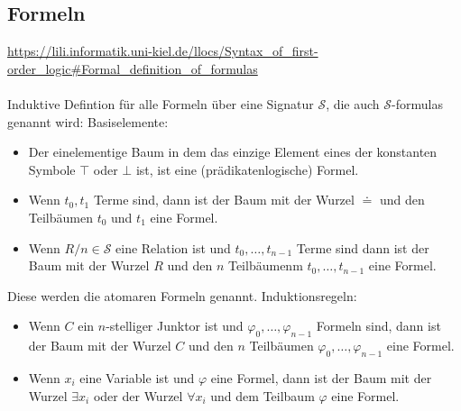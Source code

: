 \documentclass[twocolumn]{article}
\begin{document}
    \subsection{Formeln}
    \url{https://lili.informatik.uni-kiel.de/llocs/Syntax_of_first-order_logic#Formal_definition_of_formulas}\\\\
    Induktive Defintion für alle Formeln über eine Signatur $\mathcal{S}$, die auch $\mathcal{S}$-formulas genannt wird:
    Basiselemente:\\
    \begin{itemize}
        \item Der einelementige Baum in dem das einzige Element eines der konstanten Symbole $\top$ oder $\bot$ ist, ist eine (prädikatenlogische) Formel.
        \item Wenn $t_0,t_1$ Terme sind, dann ist der Baum mit der Wurzel $\doteq$ und den Teilbäumen $t_0$ und $t_1$ eine Formel.
        \item Wenn $R/n \in \mathcal S$ eine Relation ist und $t_0,\dots,t_{n-1}$ Terme sind dann ist der Baum mit der Wurzel $R$ und den $n$ Teilbäumenm $t_0, \dots, t_{n-1}$ eine Formel.
    \end{itemize}
    Diese werden die atomaren Formeln genannt.
    Induktionsregeln:\\
    \begin{itemize}
        \item Wenn $C$ ein $n$-stelliger Junktor ist und $\varphi_0,\dots,\varphi_{n-1}$ Formeln sind, dann ist der Baum mit der Wurzel $C$ und den $n$ Teilbäumen $\varphi_0,\dots,\varphi_{n-1}$ eine Formel.
        \item Wenn $x_i$ eine Variable ist und $\varphi$ eine Formel, dann ist der Baum mit der Wurzel $\exists x_i$ oder der Wurzel $\forall x_i$ und dem Teilbaum $\varphi$ eine Formel.
    \end{itemize}
\end{document}
